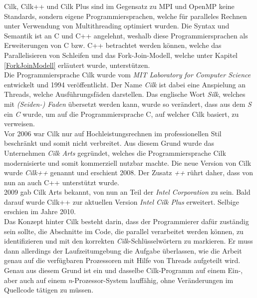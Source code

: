 			Cilk, Cilk++ und Cilk Plus sind im Gegensatz zu MPI und OpenMP keine Standards, sondern eigene Programmiersprachen, welche für paralleles Rechnen unter Verwendung von Multithreading optimiert wurden. Die Syntax und Semantik ist an C und C++ angelehnt, weshalb diese Programmiersprachen als Erweiterungen von C bzw. C++ betrachtet werden können, welche das Parallelisieren von Schleifen und das Fork-Join-Modell, welche unter Kapitel \ref{ForkJoinModell} erläutert wurde, unterstützen.\\
			Die Programmiersprache Cilk wurde vom \textit{MIT Laboratory for Computer Science} entwickelt und 1994 veröffentlicht. Der Name \textit{Cilk} ist dabei eine Anspielung an Threads, welche Ausführungsfäden darstellen. Das englische Wort \textit{Silk}, welches mit \textit{(Seiden-) Faden} übersetzt werden kann, wurde so verändert, dass aus dem \textit{S} ein \textit{C} wurde, um auf die Programmiersprache C, auf welcher Cilk basiert, zu verweisen.\\
			Vor 2006 war Cilk nur auf Hochleistungsrechnen im professionellen Stil beschränkt und somit nicht verbreitet. Aus diesem Grund wurde das Unternehmen \textit{Cilk Arts} gegründet, welches die Programmiersprache Cilk modernisierte und somit kommerziell nutzbar machte. Die neue Version von Cilk wurde \textit{Cilk++} genannt und erschient 2008. Der Zusatz \textit{++} rührt daher, dass von nun an auch C++ unterstützt wurde.\\
			2009 gab Cilk Arts bekannt, von nun an Teil der \textit{Intel Corporation} zu sein. Bald darauf wurde Cilk++ zur aktuellen Version \textit{Intel Cilk Plus} erweitert. Selbige erschien im Jahre 2010.\\
			Das Konzept hinter Cilk besteht darin, dass der Programmierer dafür zuständig sein sollte, die Abschnitte im Code, die parallel verarbeitet werden können, zu identifizieren und mit den korrekten \textit{Cilk}-Schlüsselwörtern zu markieren. Er muss dann allerdings der Laufzeitumgebung die Aufgabe überlassen, wie die Arbeit genau auf die verfügbaren Prozessoren mit Hilfe von Threads aufgeteilt wird. Genau aus diesem Grund ist ein und dasselbe Cilk-Programm auf einem Ein-, aber auch auf einem \textit{n}-Prozessor-System lauffähig, ohne Veränderungen im Quellcode tätigen zu müssen.\\
